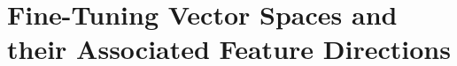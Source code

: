 



\section{Fine-Tuning Vector Spaces and their Associated Feature Directions}\label{secFinetuning}


